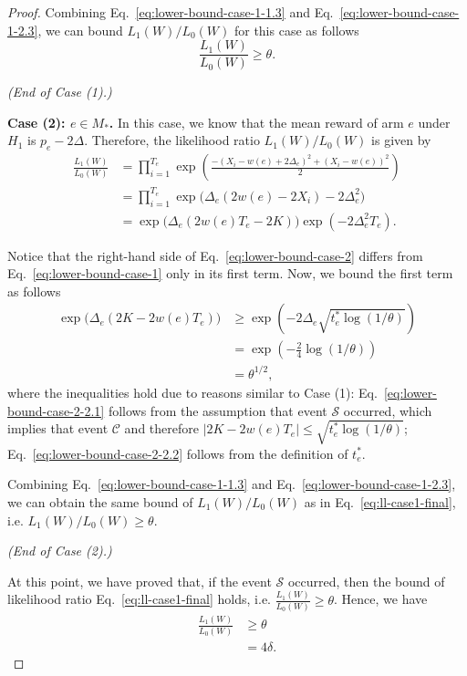 \documentclass{article}
\begin{document}
\begin{spacing}{1.1}
\begin{proof}
Combining Eq.~\eqref{eq:lower-bound-case-1-1.3} and Eq.~\eqref{eq:lower-bound-case-1-2.3}, we can bound $L_1(W)/L_0(W)$ for this case as follows
\begin{equation}
\label{eq:ll-case1-final} 
\frac{L_1(W)}{L_0(W)} \ge \theta. 
\end{equation}


\emph{(End of Case (1).)}

\textbf{Case (2): $e\in M_*$.}
In this case, we know that the mean reward of arm $e$ under $H_1$ is $p_e-2\Delta$.
Therefore, the likelihood ratio $L_1(W)/L_0(W)$ is given by
\begin{align}
  \frac{L_1(W)}{L_0(W)} &= \prod_{i=1}^{T_e} \exp\left(\frac{-(X_i-w(e)+2\Delta_e)^2+(X_i-w(e))^2}{2}\right) \nonumber \\
  						&= \prod_{i=1}^{T_e} \exp\big(\Delta_e(2w(e)-2X_i)-2\Delta_e^2\big) \nonumber \\
  						&= \exp\big(\Delta_e(2w(e)T_e-2K)\big)\exp(-2\Delta_e^2T_e) \label{eq:lower-bound-case-2}.
\end{align}

Notice that the right-hand side of Eq.~\eqref{eq:lower-bound-case-2} differs from Eq.~\eqref{eq:lower-bound-case-1} only in its first term.
Now, we bound the first term as follows
\begin{align}
	\exp\big(\Delta_e(2K-2w(e)T_e)\big) & \ge \exp\left(-2\Delta_e\sqrt{t_e^*\log(1/\theta)}\right) \label{eq:lower-bound-case-2-2.1}\\
								       & = \exp\left(-\frac{2}{4}\log(1/\theta)\right) \label{eq:lower-bound-case-2-2.2}\\
								       &=\theta^{1/2},  \label{eq:lower-bound-case-2-2.3}
\end{align}
where the inequalities hold due to reasons similar to Case (1): Eq.~\eqref{eq:lower-bound-case-2-2.1} follows from the assumption that event $\mathcal S$ occurred, which implies that event $\mathcal C$ and therefore $|2K-2w(e)T_e| \le \sqrt{t_e^*\log(1/\theta)}$; 
Eq.~\eqref{eq:lower-bound-case-2-2.2} follows from the definition of $t_e^*$.

Combining Eq.~\eqref{eq:lower-bound-case-1-1.3} and Eq.~\eqref{eq:lower-bound-case-1-2.3}, we  can obtain the same bound of $L_1(W)/L_0(W)$ as in Eq.~\eqref{eq:ll-case1-final}, i.e. $L_1(W)/L_0(W) \ge \theta$.

\emph{(End of Case (2).)}

At this point, we have proved that, if the event $\mathcal S$ occurred, then the bound of likelihood ratio Eq.~\eqref{eq:ll-case1-final} holds, i.e. $\frac{L_1(W)}{L_0(W)} \ge \theta$.
Hence, we have
\begin{align}
\frac{L_1(W)}{L_0(W)} &\ge \theta \nonumber \\
					  &= 4\delta.	
\end{align}



\end{proof}
\end{spacing}
\end{document}
